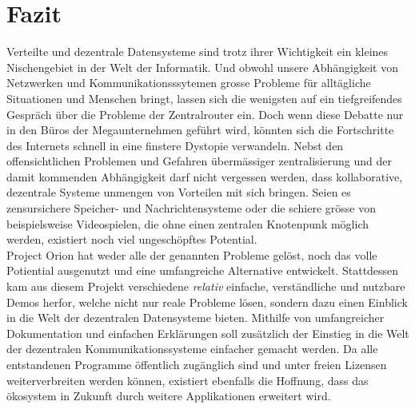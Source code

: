 \documentclass[11pt]{article}
\begin{document}
\section{Fazit}
\label{sec:org68b8704}
Verteilte und dezentrale Datensysteme sind trotz ihrer Wichtigkeit ein
kleines Nischengebiet in der Welt der Informatik. Und obwohl unsere
Abhängigkeit von Netzwerken und Kommunikationsssytemen grosse Probleme
für alltägliche Situationen und Menschen bringt, lassen sich die
wenigsten auf ein tiefgreifendes Gespräch über die Probleme der
Zentralrouter ein. Doch wenn diese Debatte nur in den Büros der
Megaunternehmen geführt wird, könnten sich die Fortschritte des
Internets schnell in eine finstere Dystopie verwandeln. Nebst den
offensichtlichen Problemen und Gefahren übermässiger zentralisierung
und der damit kommenden Abhängigkeit darf nicht vergessen werden, dass
kollaborative, dezentrale Systeme unmengen von Vorteilen mit sich
bringen. Seien es zensursichere Speicher- und Nachrichtensysteme oder
die schiere grösse von beispielsweise Videospielen, die ohne einen
zentralen Knotenpunk möglich werden, existiert noch viel ungeschöpftes
Potential.\\

\noindent Project Orion hat weder alle der genannten Probleme gelöst,
noch das volle Potiential ausgenutzt und eine umfangreiche Alternative
entwickelt. Stattdessen kam aus diesem Projekt verschiedene \emph{relativ}
einfache, verständliche und nutzbare Demos herfor, welche nicht nur
reale Probleme lösen, sondern dazu einen Einblick in die Welt der
dezentralen Datensysteme bieten. Mithilfe von umfangreicher
Dokumentation und einfachen Erklärungen soll zusätzlich der Einstieg
in die Welt der dezentralen Kommunikationssysteme einfacher gemacht
werden. Da alle entstandenen Programme öffentlich zugänglich sind und
unter freien Lizensen weiterverbreiten werden können, existiert
ebenfalls die Hoffnung, dass das ökosystem in Zukunft durch weitere
Applikationen erweitert wird.


\end{document}
